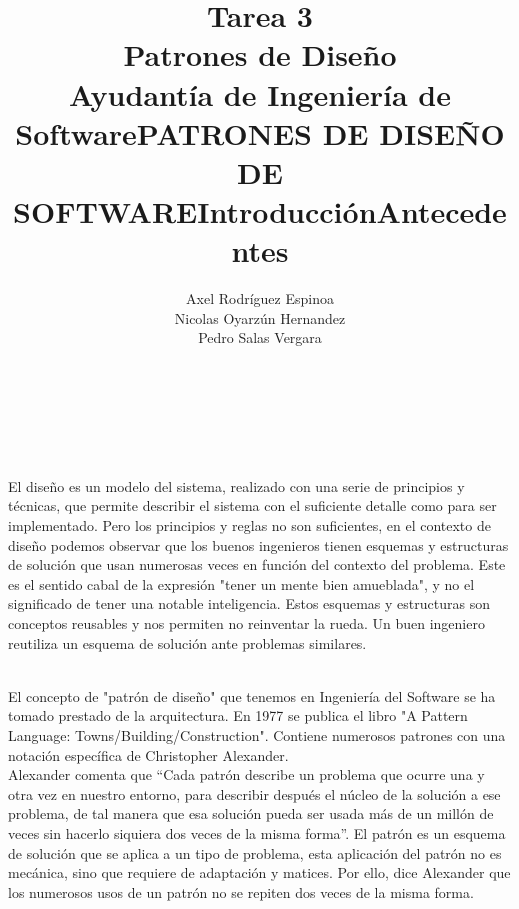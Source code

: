 \documentclass[a4paper,10pt]{report}
\begin{document}
\title{\textbf{Tarea 3\\Patrones de Diseño\\}Ayudantía de Ingeniería de Software}
\author{Axel Rodríguez Espinoa\\
        Nicolas Oyarzún Hernandez\\
        Pedro Salas Vergara}
\maketitle


\title {\textbf{PATRONES DE DISEÑO DE SOFTWARE}}\\\\

\title{\textbf{Introducción}}\\

El diseño es un modelo del sistema, realizado con una serie de principios y técnicas, que permite describir el sistema con el suficiente detalle como para ser implementado. Pero los principios y reglas no son suficientes, en el contexto de diseño podemos observar que los buenos ingenieros tienen esquemas y estructuras de solución que usan numerosas veces en función del contexto del problema. Este es el sentido cabal de la expresión "tener un mente bien amueblada", y no el significado de tener una notable inteligencia. Estos esquemas y estructuras son conceptos reusables y nos permiten no reinventar la rueda. Un buen ingeniero reutiliza un esquema de solución ante problemas similares.\\

\title{\textbf{Antecedentes}}\\

El concepto de "patrón de diseño" que tenemos en Ingeniería del Software se ha tomado prestado de la arquitectura. En 1977 se publica el libro "A Pattern Language: Towns/Building/Construction". Contiene numerosos patrones con una notación específica de Christopher Alexander.\\

Alexander comenta que “Cada patrón describe un problema que ocurre una y otra vez en nuestro entorno, para describir después el núcleo de la solución a ese problema, de tal manera que esa solución pueda ser usada más de un millón de veces sin hacerlo siquiera dos veces de la misma forma”. El patrón es un esquema de solución que se aplica a un tipo de problema, esta aplicación del patrón no es mecánica, sino que requiere de adaptación y matices. Por ello, dice Alexander que los numerosos usos de un patrón no se repiten dos veces de la misma forma.\\
\end{document}
